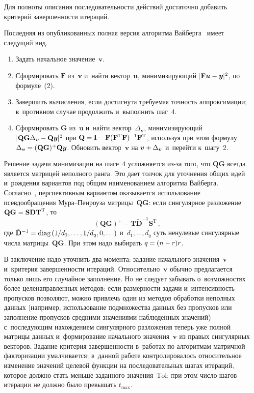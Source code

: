 \begin{multicols}{2}
Для полноты описания последовательности действий достаточно добавить 
критерий завершенности итераций. 

     Последняя из опубликованных полная версия алгоритма 
Вайберга~\cite{4-kri} имеет следущий вид.
     \begin{enumerate}[1.]
\item Задать начальное значение~$\bm{v}$.
\item Сформировать $\mathbf{F}$ из~$\bm{v}$ и~найти вектор~$\bm{u}$, 
минимизирующий $\vert \mathbf{F}\bm{u}\hm- \bm{y}\vert^2$, по формуле~(2).
\item Завершить вычисления, если достигнута требуемая точность 
аппроксимации; в~противном случае продолжить и~выполнить шаг~4.
\item Сформировать $\mathbf{G}$ из~$\bm{u}$ и~найти вектор~$\Delta_{\bm 
v}$, минимизирующий $\vert \mathbf{QG}\Delta_{\bm v} \hm- 
\mathbf{Q}\bm{y}\vert^2$ при $\mathbf{Q}\hm= \mathbf{I}\hm- 
\mathbf{F}(\mathbf{F}^{\mathrm{T}}\mathbf{F})^{-1}\mathbf{F}^{\mathrm{T}}$, используя при этом 
формулу $\Delta_{\bm v}\hm= (\mathbf{QG})^+\mathbf{Q}\bm{y}$. Обновить 
вектор~$\bm{v}$ на $\bm{v}\hm+ \Delta_{\bm v}$ и~перейти к~шагу~2. 
\end{enumerate}
     
     Решение задачи минимизации на шаге~4 усложняется из-за того, что 
$\mathbf{QG}$ всегда является матрицей неполного ранга. Это дает толчок для 
уточнения общих идей~\cite{3-kri} и~рождения вариантов под общим 
наименованием алгоритма Вайберга. Согласно~\cite{4-kri}, перспективным 
вариантом оказывается использование псевдообращения Му\-ра--Пен\-роу\-за 
матрицы~$\mathbf{QG}$: если сингулярное разложение $\mathbf{QG}\hm= 
\mathbf{SDT}^{\mathrm{T}}$, то
     $$
     \left(\mathbf{QG}\right)^+ - \mathbf{T} \tilde{\mathbf{D}}^{-1} 
\mathbf{S}^{\mathrm{T}}\,,
     $$
где $\tilde{\mathbf{D}}^{-1}\hm= \mathrm{diag}\,(1/d_1, \ldots, 1/d_q, 0, \ldots)$ 
и~$d_1,\ldots, d_q$ суть ненулевые сингулярные числа матрицы~$\mathbf{QG}$. 
При этом надо выбирать $q\hm= (n\hm-r)r$.
     
     В заключение надо уточнить два момента: задание начального 
значения~$\bm{v}$ и~критерия завершенности итераций. 
Относительно~$\bm{v}$ обычно предлагается только лишь его случайное 
заполнение. Но не следует забывать о~возможностях более целенаправленных 
методов: если размерности задачи и~интенсивность пропусков позволяют, 
можно привлечь один из методов обработки неполных данных (например, 
использование подмножества данных без пропусков или заполнение пропусков 
средними значениями наблюденных значений) с~последующим нахождением 
сингулярного разложения теперь уже полной матрицы данных и~формирование 
начального значения~$\bm{v}$ из правых сингулярных векторов. Задание 
критерия завершенности в~работах по алгоритмам матричной факторизации 
умалчивается; в~данной работе контролировалось относительное изменение 
значений целевой функции на последовательных шагах итераций, которое 
должно стать меньше заданного значения~$\mathrm{Tol}$; при этом число шагов 
итерации не должно было превышать $t_{\max}$.
     

\end{multicols}
